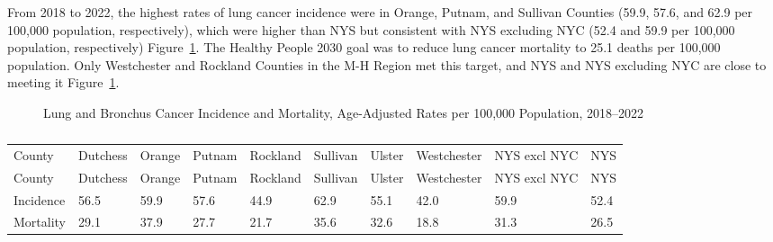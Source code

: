 \documentclass[
  english,
  letterpaper,
]{report}
\begin{document}
From 2018 to 2022, the highest rates of lung cancer incidence were in
Orange, Putnam, and Sullivan Counties (59.9, 57.6, and 62.9 per 100,000
population, respectively), which were higher than NYS but consistent
with NYS excluding NYC (52.4 and 59.9 per 100,000 population,
respectively) Figure~\ref{fig-lungbronchca-incident-mortal-aar}. The
Healthy People 2030 goal was to reduce lung cancer mortality to 25.1
deaths per 100,000 population. Only Westchester and Rockland Counties in
the M-H Region met this target, and NYS and NYS excluding NYC are close
to meeting it Figure~\ref{fig-lungbronchca-incident-mortal-aar}.

\begin{figure}


\caption{\label{fig-lungbronchca-incident-mortal-aar}Lung and Bronchus
Cancer Incidence and Mortality, Age-Adjusted Rates per 100,000
Population, 2018--2022}

\end{figure}%

\begin{longtable}[]{@{}llllllllll@{}}

\caption{\label{tbl-lungbronchca-incident-mortal-aar}Lung and Bronchus
Cancer Incidence and Mortality, Age-Adjusted Rates per 100,000
Population, 2018--2022}

\tabularnewline

\caption{}\label{T_6d7cb}\tabularnewline
\toprule\noalign{}
County & Dutchess & Orange & Putnam & Rockland & Sullivan & Ulster &
Westchester & NYS excl NYC & NYS \\
\midrule\noalign{}
\endfirsthead
\toprule\noalign{}
County & Dutchess & Orange & Putnam & Rockland & Sullivan & Ulster &
Westchester & NYS excl NYC & NYS \\
\midrule\noalign{}
\endhead
\bottomrule\noalign{}
\endlastfoot
Incidence & 56.5 & 59.9 & 57.6 & 44.9 & 62.9 & 55.1 & 42.0 & 59.9 &
52.4 \\
Mortality & 29.1 & 37.9 & 27.7 & 21.7 & 35.6 & 32.6 & 18.8 & 31.3 &
26.5 \\

\end{longtable}
\end{document}
